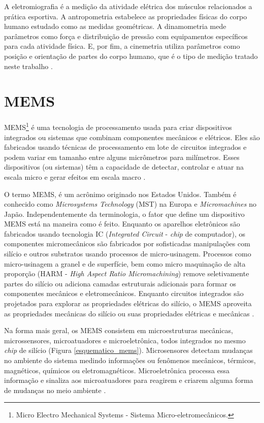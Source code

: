 A eletromiografia é a medição da atividade elétrica dos músculos relacionados a prática esportiva. A antropometria estabelece as propriedades físicas do corpo humano estudado como as medidas geométricas. A dinamometria mede parâmetros como força e distribuição de pressão com equipamentos específicos para cada atividade física. E, por fim, a cinemetria utiliza parâmetros como posição e orientação de partes do corpo humano, que é o tipo de medição tratado neste trabalho \cite{amadio2007}\cite{medeiros2013}.
	
	\section{MEMS}

		MEMS\footnote{Micro Electro Mechanical Systems - Sistema Micro-eletromecânicos.}  é uma tecnologia de processamento usada para criar dispositivos integrados ou sistemas que combinam componentes mecânicos e elétricos. Eles são fabricados usando técnicas de processamento em lote de circuitos integrados e podem variar em tamanho entre alguns micrômetros para milímetros. Esses dispositivos (ou sistemas) têm a capacidade de detectar, controlar e atuar na escala micro e gerar efeitos em escala macro \cite{prime2002}. 

		O termo MEMS, é um acrônimo originado nos Estados Unidos. Também é conhecido como \textit{Microsystems Technology} (MST) na Europa e \textit{Micromachines} no Japão. Independentemente da terminologia, o fator que define um dispositivo MEMS está na maneira como é feito. Enquanto os aparelhos eletrônicos são fabricados usando tecnologia IC (\textit{Integrated Circuit} - \textit{chip} de computador), os componentes micromecânicos são fabricados por sofisticadas manipulações com silício e outros substratos usando processos de micro-usinagem. Processos como micro-usinagem a granel e de superfície, bem como micro maquinação de alta proporção (HARM - \textit{High Aspect Ratio Micromachining}) remove seletivamente partes do silício ou adiciona camadas estruturais adicionais para formar os componentes mecânicos e eletromecânicos. Enquanto circuitos integrados são projetados para explorar as propriedades elétricas do silício, o MEMS aproveita as propriedades mecânicas do silício ou suas propriedades elétricas e mecânicas \cite{prime2002}.

		Na forma mais geral, os MEMS consistem em microestruturas mecânicas, microssensores, microatuadores e microeletrônica, todos integrados no mesmo \textit{chip} de silício (Figura \ref{esquematico_mems}). Microsensores detectam mudanças no ambiente do sistema medindo informações ou fenômenos mecânicos, térmicos, magnéticos, químicos ou eletromagnéticos. Microeletrônica processa essa informação e sinaliza aos microatuadores para reagirem e criarem alguma forma de mudanças no meio ambiente \cite{prime2002}.

